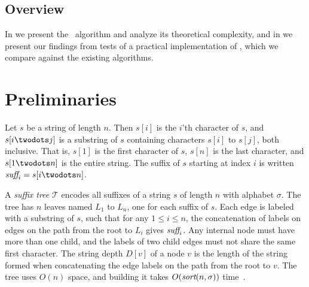 \documentclass[a4]{article}
\newcommand*{\pref}{\prettyref}
\begin{document}
\subsection{Overview}
In \pref{sec:fprintk} we present the \fprintk\ algorithm and analyze its theoretical complexity, and in \pref{sec:results} we present our findings from tests of a practical implementation of \fprintk, which we compare against the existing algorithms.

\section{Preliminaries}

Let $s$ be a string of length $n$. Then $s[i]$ is the $i$'th character of $s$, and $s[i\twodots j]$ is a substring of $s$ containing characters $s[i]$ to $s[j]$, both inclusive. That is, $s[1]$ is the first character of $s$, $s[n]$ is the last character, and $s[1\twodots n]$ is the entire string. The suffix of $s$ starting at index $i$ is written $\suff_i = s[i\twodots n]$.

A \emph{suffix tree} $\mathcal{T}$ encodes all suffixes of a string $s$ of length $n$ with alphabet $\sigma$. The tree has $n$ leaves named $L_1$ to $L_n$, one for each suffix of $s$. Each edge is labeled with a substring of $s$, such that for any $1\leq i\leq n$, the concatenation of labels on edges on the path from the root to $L_i$ gives $\textit{suff}_i$. Any internal node must have more than one child, and the labels of two child edges must not share the same first character. The string depth $D[v]$ of a node $v$ is the length of the string formed when concatenating the edge labels on the path from the root to $v$.
The tree uses $O(n)$ space, and building it takes $O(\textit{sort}(n,\sigma))$ time~\cite{sort-complexity}.
\end{document}
